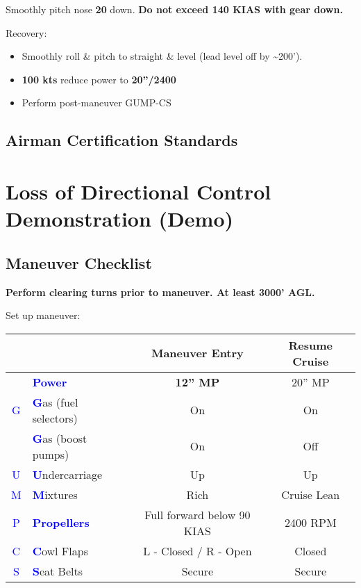 {Smoothly pitch nose \textbf{20\degree{}} down. \textbf{Do not exceed 140 KIAS with gear down.}

Recovery:
\begin{itemize}[label={}]
\item Smoothly roll \& pitch to straight \& level (lead level off by \~{}200’).
\item \textbf{100 kts} reduce power to \textbf{20''/2400}
\item Perform post-maneuver GUMP-CS
\end{itemize}
\subsection{Airman Certification Standards}
\newpage

\section{Loss of Directional Control Demonstration (\vmc Demo)}
\subsection{Maneuver Checklist}

\textbf{Perform clearing turns prior to maneuver. At least 3000' AGL.}

Set up maneuver:

\begin{table}[H]
\centering
\begin{tabular}{|c|l|c|c|}
\hline
                    &                                                 & \textbf{Maneuver Entry} & \textbf{Resume Cruise} \\ \hline
                    & \textcolor{blue}{\textbf{Power}}                & \textbf{12'' MP}        & 20'' MP                \\ \hline
\textcolor{blue}{G} & \textcolor{blue}{\textbf{G}}as (fuel selectors) & On                      & On                     \\
                    & \textcolor{blue}{\textbf{G}}as (boost pumps)    & On                      & Off                    \\ \hline
\textcolor{blue}{U} & \textcolor{blue}{\textbf{U}}ndercarriage        & Up                      & Up                     \\ \hline
\textcolor{blue}{M} & \textcolor{blue}{\textbf{M}}ixtures             & Rich                    & Cruise Lean            \\ \hline
\textcolor{blue}{P} & \textcolor{blue}{\textbf{Propellers}}           & Full forward below 90 KIAS & 2400 RPM            \\ \hline
\textcolor{blue}{C} & \textcolor{blue}{\textbf{C}}owl Flaps           & L - Closed / R - Open   & Closed                 \\ \hline
\textcolor{blue}{S} & \textcolor{blue}{\textbf{S}}eat Belts           & Secure                  & Secure                 \\ \hline
\end{tabular}
\end{table}

}
